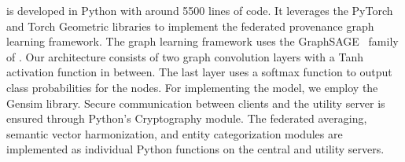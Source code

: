  \Sys is developed in Python with around 5500 lines of code. It leverages the PyTorch and Torch Geometric libraries to implement the federated provenance graph learning framework. The graph learning framework uses the GraphSAGE~\cite{hamilton2017inductive} family of \gnnshort. Our architecture consists of two graph convolution layers with a Tanh activation function in between. The last layer uses a softmax function to output class probabilities for the nodes. For implementing the \wordvec model, we employ the Gensim library. Secure communication between clients and the utility server is ensured through Python's Cryptography module. The federated averaging, semantic vector harmonization, and entity categorization modules are implemented as individual Python functions on the central and utility servers.


